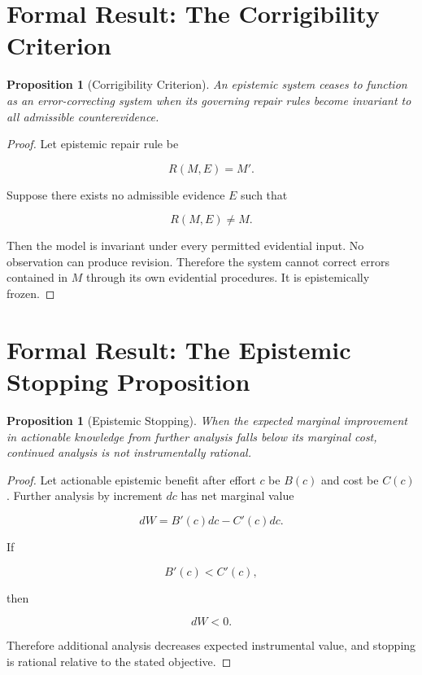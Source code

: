 \documentclass[11pt,oneside]{book}
\newtheorem{proposition}[theorem]{Proposition}
\theoremstyle{definition}
\theoremstyle{remark}
\begin{document}
\section{Formal Result: The Corrigibility Criterion}

\begin{proposition}[Corrigibility Criterion]
An epistemic system ceases to function as an error-correcting system when its governing repair rules become invariant to all admissible counterevidence.
\end{proposition}

\begin{proof}
Let epistemic repair rule be

\[
R(M,E)=M'.
\]

Suppose there exists no admissible evidence \(E\) such that

\[
R(M,E)\neq M.
\]

Then the model is invariant under every permitted evidential input. No observation can produce revision. Therefore the system cannot correct errors contained in \(M\) through its own evidential procedures. It is epistemically frozen.
\end{proof}

\section{Formal Result: The Epistemic Stopping Proposition}

\begin{proposition}[Epistemic Stopping]
When the expected marginal improvement in actionable knowledge from further analysis falls below its marginal cost, continued analysis is not instrumentally rational.
\end{proposition}

\begin{proof}
Let actionable epistemic benefit after effort \(c\) be \(B(c)\) and cost be \(C(c)\). Further analysis by increment \(dc\) has net marginal value

\[
dW
=
B'(c)dc-C'(c)dc.
\]

If

\[
B'(c)<C'(c),
\]

then

\[
dW<0.
\]

Therefore additional analysis decreases expected instrumental value, and stopping is rational relative to the stated objective.
\end{proof}
\end{document}
